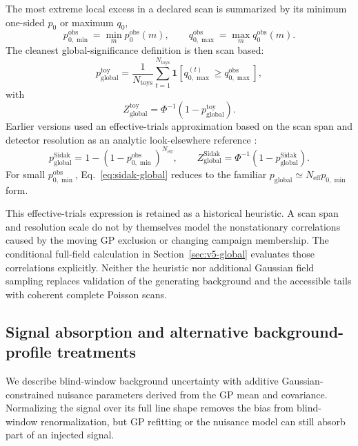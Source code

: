 The most extreme local excess in a declared scan is summarized by its minimum
one-sided $p_0$ or maximum $q_0$,
\begin{equation}
p_{0,\min}^{\mathrm{obs}} = \min_m p_0^{\mathrm{obs}}(m),
\qquad
q_{0,\max}^{\mathrm{obs}} = \max_m q_0^{\mathrm{obs}}(m).
\end{equation}
The cleanest global-significance definition is then scan based:
\begin{equation}
p_{\mathrm{global}}^{\mathrm{toy}}
=
\frac{1}{N_{\mathrm{toys}}}
\sum_{t=1}^{N_{\mathrm{toys}}}
\mathbf{1}\!\left[
q_{0,\max}^{(t)} \ge q_{0,\max}^{\mathrm{obs}}
\right],
\label{eq:pglobal-toy}
\end{equation}
with
\begin{equation}
Z_{\mathrm{global}}^{\mathrm{toy}} = \Phi^{-1}\!\left(1-p_{\mathrm{global}}^{\mathrm{toy}}\right).
\end{equation}
Earlier versions used an effective-trials approximation based on the scan span
and detector resolution as an analytic look-elsewhere reference \cite{GrossVitells2010}:
\begin{equation}
p_{\mathrm{global}}^{\mathrm{Sidak}}
=
1-\left(1-p_{0,\min}^{\mathrm{obs}}\right)^{N_{\mathrm{eff}}},
\qquad
Z_{\mathrm{global}}^{\mathrm{Sidak}}
=
\Phi^{-1}\!\left(1-p_{\mathrm{global}}^{\mathrm{Sidak}}\right).
\label{eq:sidak-global}
\end{equation}
For small $p_{0,\min}^{\mathrm{obs}}$, Eq.~\eqref{eq:sidak-global} reduces to the
familiar $p_{\mathrm{global}}\simeq N_{\mathrm{eff}}p_{0,\min}$ form.

This effective-trials expression is retained as a historical heuristic. A
scan span and resolution scale do not by themselves model the nonstationary
correlations caused by the moving GP exclusion or changing campaign membership.
The conditional full-field calculation in Section~\ref{sec:v5-global} evaluates
those correlations explicitly. Neither the heuristic nor additional Gaussian
field sampling replaces validation of the generating background and the
accessible tails with coherent complete Poisson scans.

\subsection{Signal absorption and alternative background-profile treatments}

We describe blind-window background uncertainty with additive Gaussian-constrained
nuisance parameters derived from the GP mean and covariance. Normalizing the signal
over its full line shape removes the bias from blind-window renormalization, but GP
refitting or the nuisance model can still absorb part of an injected signal.

